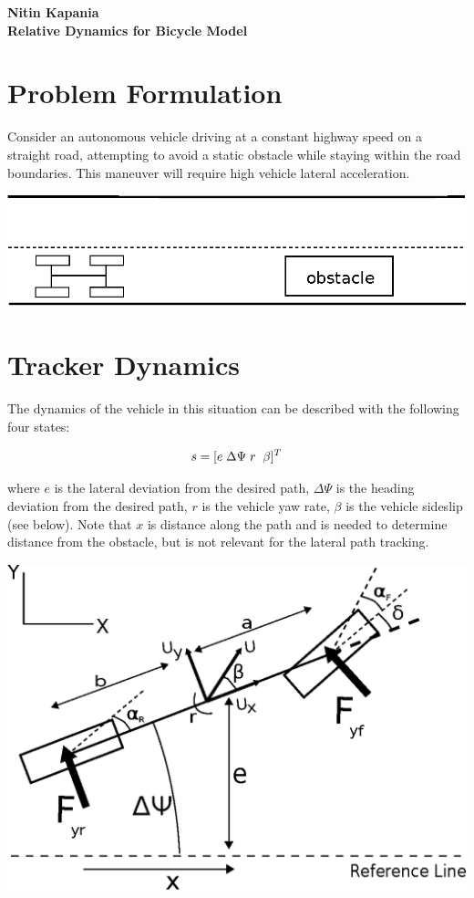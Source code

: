 \documentclass[11pt]{article}
\begin{document}
\textbf{Nitin Kapania} \\
\textbf{Relative Dynamics for Bicycle Model} \\ 

\section{Problem Formulation}
Consider an autonomous vehicle driving at a constant highway speed on a straight road, attempting to avoid a static obstacle while staying within the road boundaries. This maneuver will require high vehicle lateral acceleration. 

\begin{center}
 \includegraphics[width=.6\textwidth]{Images/problemDefinition.eps}
\end{center}


\section{Tracker Dynamics}

The dynamics of the vehicle in this situation can be described with the following four states:

\begin{equation} 
s = [e \hspace{1 mm} \Delta\Psi \hspace{1 mm}  r \hspace{1 mm} \hspace{1 mm} \beta]^T
\end{equation}

where $e$ is the lateral deviation from the desired path, $\Delta\Psi$ is the heading deviation from the desired path, $r$ is the vehicle yaw rate, $\beta$ is the vehicle sideslip (see below). Note that $x$ is distance along the path and is needed to determine distance from the obstacle, but is not relevant for the lateral path tracking.  

 \begin{center}
   \includegraphics[width=.6\textwidth]{Images/bikeModel2.eps}
 \end{center}
\end{document}
